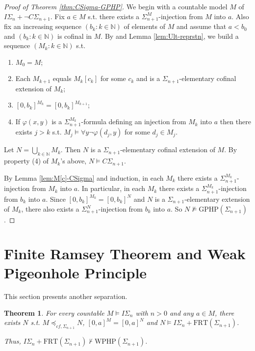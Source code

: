 \documentclass[twoside,a4paper]{amsart}
\newtheorem{theorem}{Theorem}[section]
\theoremstyle{definition}
\theoremstyle{theorem}
\numberwithin{equation}{section}
\newcommand{\<}{\langle}
\renewcommand{\>}{\rangle}
\newcommand{\WPHP}{\mathrm{WPHP}}
\newcommand{\GPHP}{\mathrm{GPHP}}
\newcommand{\FRT}{\mathrm{FRT}}
\begin{document}
\begin{proof}[Proof of Theorem \ref{thm:CSigma-GPHP}]
We begin with a countable model $M$ of $I\Sigma_n + \neg C\Sigma_{n+1}$.
Fix $a \in M$ s.t. there exists a $\Sigma_{n+1}^M$-injection from $M$ into $a$.
Also fix an increasing sequence $(b_k: k \in \mathbb{N})$ of elements of $M$ 
 and assume that $a < b_0$ and $(b_k: k \in \mathbb{N})$ is cofinal in $M$.
By \cite[Lemma 5.3]{BCWWY:2021} and Lemma \ref{lem:Ult-reprstn}, we build a sequence $(M_k: k \in \mathbb{N})$ s.t.
\begin{enumerate}
 \item $M_0 = M$;
 \item Each $M_{k+1}$ equals $M_k[c_k]$ for some $c_k$ and is a $\Sigma_{n+1}$-elementary cofinal extension of $M_k$;
 \item $[0,b_k]^{M_k} = [0,b_k]^{M_{k+1}}$;
 \item If $\varphi(x,y)$ is a $\Sigma_{n+1}^{M_k}$-formula defining an injection from $M_k$ into $a$
 then there exists $j > k$ s.t. $M_j \models \forall y \neg \varphi(d_j,y)$ for some $d_j \in M_j$.
\end{enumerate}
Let $N = \bigcup_{k \in \mathbb{N}} M_k$.
Then $N$ is a $\Sigma_{n+1}$-elementary cofinal extension of $M$.
By property (4) of $M_k$'s above, $N \models C\Sigma_{n+1}$.

By Lemma \ref{lem:M[c]-CSigma} and induction,
in each $M_k$ there exists a $\Sigma_{n+1}^{M_k}$-injection from $M_k$ into $a$.
In particular, in each $M_k$ there exists a $\Sigma_{n+1}^{M_k}$-injection from $b_k$ into $a$.
Since $[0,b_k]^{M_k} = [0,b_k]^N$ and $N$ is a $\Sigma_{n+1}$-elementary extension of $M_k$,
 there also exists a $\Sigma_{n+1}^N$-injection from $b_k$ into $a$.
So $N \not\models \GPHP(\Sigma_{n+1})$.
\end{proof}

\section{Finite Ramsey Theorem and Weak Pigeonhole Principle}

This section presents another separation.

\begin{theorem}\label{thm:FRT-WPHP}
For every countable $M \models I\Sigma_n$ with $n > 0$ and any $a \in M$,
there exists $N$ s.t. $M \preceq_{cf,\Sigma_{n+1}} N$, $[0,a]^M = [0,a]^N$ and
$N \models I\Sigma_n + \FRT(\Sigma_{n+1})$.

Thus,
$I\Sigma_n + \FRT(\Sigma_{n+1}) \not\vdash \WPHP(\Sigma_{n+1})$.
\end{theorem}
\end{document}
